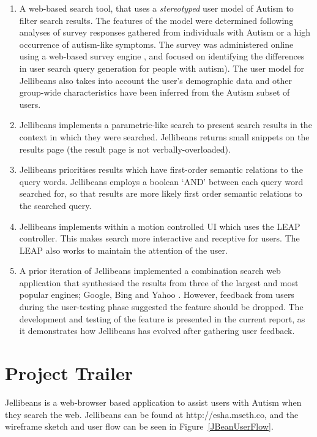 \documentclass[a4paper, 11pt]{article}
\begin{document}
\begin{enumerate}
\item {A web-based search tool, that uses a \textit{stereotyped} user model of Autism to filter search results. The features of the model were determined following analyses of survey responses gathered from individuals with Autism or a high occurrence of autism-like symptoms. The survey was administered online using a web-based survey engine \cite{surveymonkey}, and focused on identifying the differences in user search query generation for people with autism). The user model for Jellibeans also takes into account the user's demographic data and other group-wide characteristics have been inferred from the Autism subset of users.}

\item {Jellibeans implements a parametric-like search to present search results in the context in which they were searched. Jellibeans returns small snippets on the results page (the result page is not verbally-overloaded).}

\item {Jellibeans prioritises results which have first-order semantic relations to the query words. Jellibeans employs a boolean `AND' between each query word searched for, so that results are more likely first order semantic relations to the searched query.}

\item {Jellibeans implements within a motion controlled UI which uses the LEAP controller. This makes search more interactive and receptive for users. The LEAP also works to maintain the attention of the user.}

\item  {A prior iteration of Jellibeans implemented a combination search web application that synthesised the results from three of the largest and most popular engines; Google, Bing and Yahoo \cite{adam}. However, feedback from users during the user-testing phase suggested the feature should be dropped. The development and testing of the feature is presented in the current report, as it demonstrates how Jellibeans has evolved after gathering user feedback.} 

\end{enumerate}


\section{Project Trailer}

Jellibeans is a web-browser based application to assist users with Autism when they search the web. Jellibeans can be found at http://esha.mseth.co, and the wireframe sketch and user flow can be seen in Figure~\ref{JBeanUserFlow}.  
\end{document}
